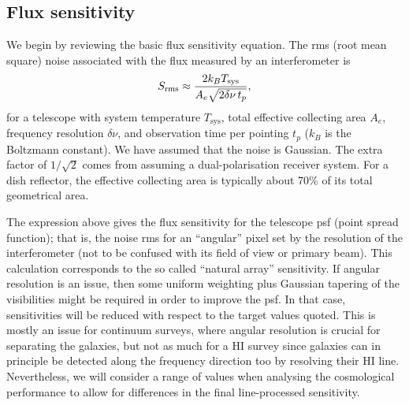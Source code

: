 \documentclass[useAMS,usenatbib]{mn2e}
\begin{document}
\subsection{Flux sensitivity} \label{sec:flux-sens}

We begin by reviewing the basic flux sensitivity equation. The rms (root mean square) noise associated with the flux measured by an interferometer is
\begin{equation}
S_{\rm rms} \approx \frac{2 k_B T_{\rm sys}}{A_{e} \sqrt{2\delta\nu\, t_p}},
\end{equation}
for a telescope with system temperature $T_\mathrm{sys}$, total effective collecting area $A_{e}$, frequency resolution $\delta\nu$, and observation time per pointing $t_p$ ($k_B$ is the Boltzmann constant). We have assumed that the noise is Gaussian.
The extra factor of $1/\sqrt{2}$ comes from assuming a dual-polarisation receiver system. For a dish reflector, the effective collecting area is typically about 70\% of its total geometrical area.

The expression above gives the flux sensitivity for the telescope psf (point spread function); that is, the noise rms for an ``angular'' pixel set by the resolution of the interferometer (not to be confused with its field of view or primary beam). This calculation corresponds to the so called ``natural array'' sensitivity. If angular resolution is an issue, then some uniform weighting plus Gaussian tapering of the visibilities might be required in order to improve the psf. In that case, sensitivities will be reduced with respect to the target values quoted. 
This is mostly an issue for continuum surveys, where angular resolution is crucial for separating the galaxies, but not as much for a HI survey since galaxies can in principle be detected along the frequency direction too by resolving their HI line. Nevertheless, we will consider a range of values when analysing the cosmological performance to allow for differences in the final line-processed sensitivity.
\end{document}
